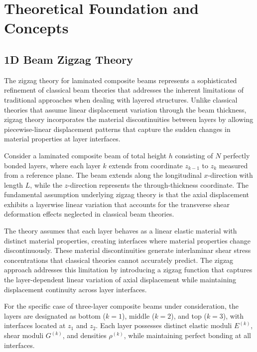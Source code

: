 \documentclass[12pt,a4paper]{report}
\begin{document}
\chapter{Theoretical Foundation and Concepts}
\label{chap:foundation}

\section{1D Beam Zigzag Theory}
\label{sec:zigzag_theory}
The zigzag theory for laminated composite beams represents a sophisticated refinement of classical beam theories that addresses the inherent limitations of traditional approaches when dealing with layered structures. Unlike classical theories that assume linear displacement variation through the beam thickness, zigzag theory incorporates the material discontinuities between layers by allowing piecewise-linear displacement patterns that capture the sudden changes in material properties at layer interfaces.

Consider a laminated composite beam of total height $h$ consisting of $N$ perfectly bonded layers, where each layer $k$ extends from coordinate $z_{k-1}$ to $z_k$ measured from a reference plane. The beam extends along the longitudinal $x$-direction with length $L$, while the $z$-direction represents the through-thickness coordinate. The fundamental assumption underlying zigzag theory is that the axial displacement exhibits a layerwise linear variation that accounts for the transverse shear deformation effects neglected in classical beam theories.

The theory assumes that each layer behaves as a linear elastic material with distinct material properties, creating interfaces where material properties change discontinuously. These material discontinuities generate interlaminar shear stress concentrations that classical theories cannot accurately predict. The zigzag approach addresses this limitation by introducing a zigzag function that captures the layer-dependent linear variation of axial displacement while maintaining displacement continuity across layer interfaces.

For the specific case of three-layer composite beams under consideration, the layers are designated as bottom ($k=1$), middle ($k=2$), and top ($k=3$), with interfaces located at $z_1$ and $z_2$. Each layer possesses distinct elastic moduli $E^{(k)}$, shear moduli $G^{(k)}$, and densities $\rho^{(k)}$, while maintaining perfect bonding at all interfaces.
\end{document}
